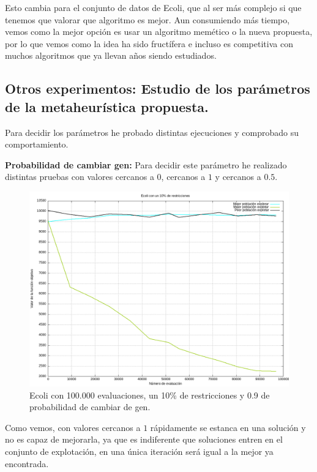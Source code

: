 \documentclass[12pt, spanish]{article}
\begin{document}
Esto cambia para el conjunto de datos de Ecoli, que al ser más complejo si que tenemos que valorar que algoritmo es mejor. Aun consumiendo más tiempo, vemos como la mejor opción es usar un algoritmo memético o la nueva propuesta, por lo que vemos como la idea ha sido fructífera e incluso es competitiva con muchos algoritmos que ya llevan años siendo estudiados.

\newpage

\subsection{Otros experimentos: Estudio de los parámetros de la metaheurística propuesta.}

Para decidir los parámetros he probado distintas ejecuciones y comprobado su comportamiento.

\textbf{Probabilidad de cambiar gen:} Para decidir este parámetro he realizado distintas pruebas con valores cercanos a $0$, cercanos a $1$ y cercanos a $0.5$.

\begin{figure}[H]
	\centering
	\includegraphics[scale = 0.5]{ecoli_1_cambiar.png}
	
	\caption{Ecoli con 100.000 evaluaciones, un 10\% de restricciones y 0.9 de probabilidad de cambiar de gen.}
	\label{fig:ecoli_2}
\end{figure}

Como vemos, con valores cercanos a $1$ rápidamente se estanca en una solución y no es capaz de mejorarla, ya que es indiferente que soluciones entren en el conjunto de explotación, en una única iteración será igual a la mejor ya encontrada.
\end{document}
